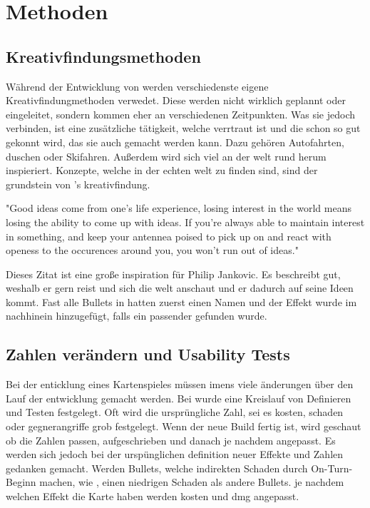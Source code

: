 
\section{Methoden}\label{sec:methoden}

\renewcommand{\kapitelautor}{Autor: Philip Jankovic}

%

\subsection{Kreativfindungsmethoden}\label{subsec:kreativfindungsmethoden}

Während der Entwicklung von \FF werden verschiedenste eigene Kreativfindungmethoden verwedet. Diese werden nicht wirklich
geplannt oder eingeleitet, sondern kommen eher an verschiedenen Zeitpunkten. Was sie jedoch verbinden, ist eine zusätzliche
tätigkeit, welche verrtraut ist und die schon so gut gekonnt wird, das sie auch  gemacht werden kann.
Dazu gehören \zB Autofahrten, duschen oder Skifahren. Außerdem wird sich viel an der welt rund herum inspieriert.
Konzepte, welche in der echten welt zu finden sind, sind der grundstein von \FF's kreativfindung.

"Good ideas come from one's life experience, losing interest in the world means losing the ability to come up with ideas.
If you're always able to maintain interest in something, and keep your antennea poised to pick up on and react with openess
to the occurences around you, you won't run out of ideas."%


Dieses Zitat ist eine große inspiration für Philip Jankovic. Es beschreibt gut, weshalb er gern reist und sich die welt
anschaut und er dadurch auf seine Ideen kommt. Fast alle Bullets in \FF hatten zuerst einen Namen und der Effekt wurde
im nachhinein hinzugefügt, falls ein passender gefunden wurde.


\subsection{Zahlen verändern und Usability Tests}\label{subsec:usability}

Bei der enticklung eines Kartenspieles müssen imens viele änderungen über den Lauf der entwicklung gemacht werden.
Bei \FF wurde eine Kreislauf von Definieren und Testen festgelegt. Oft wird die ursprüngliche Zahl, sei es kosten,
schaden oder gegnerangriffe grob festgelegt. Wenn der neue Build fertig ist, wird geschaut ob die Zahlen passen, aufgeschrieben und danach
je nachdem angepasst. Es werden sich jedoch bei der urspünglichen definition neuer Effekte und Zahlen gedanken gemacht.
\zB Werden Bullets, welche indirekten Schaden durch \zB On-Turn-Beginn machen, wie , einen niedrigen Schaden als andere Bullets.
je nachdem welchen Effekt die Karte haben werden kosten und dmg angepasst.




%

\renewcommand{\kapitelautor}{}
